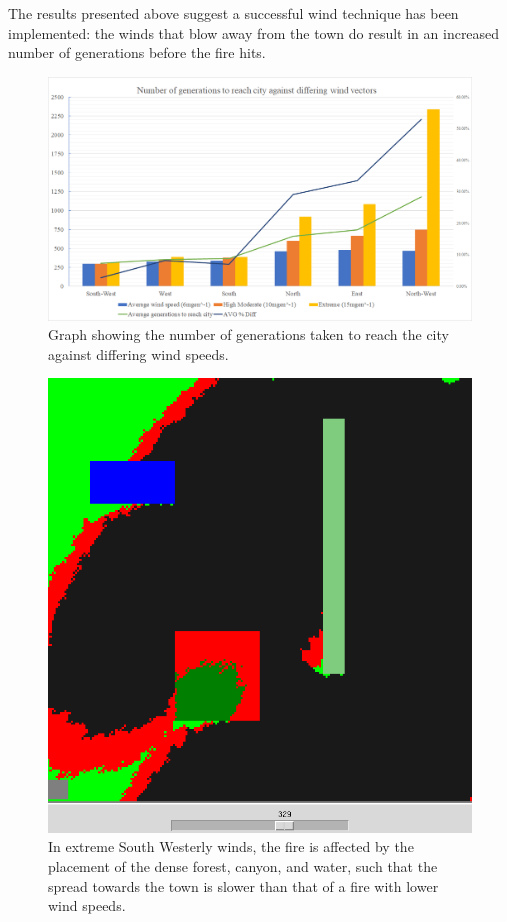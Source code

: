 \documentclass[11pt, a4paper, titlepage]{article}
\begin{document}
    The results presented above suggest a successful wind technique has been implemented: the winds that blow away from the town do result in an increased number of generations before the fire hits.
    
    
    \begin{figure}[H]
      \centering
        \includegraphics[width=\linewidth]{imgs/graphs/wind.png}
      \caption{Graph showing the number of generations taken to reach the city against differing wind speeds.}
      \label{}
    \end{figure}

  



    \begin{figure}[H]
      \centering
      \includegraphics[width=0.75\linewidth]{imgs/wind/x-15y15_gen329}
      \caption{In extreme South Westerly winds, the fire is affected by the placement of the dense forest, canyon, and water, such that the spread towards the town is slower than that of a fire with lower wind speeds.}
      \label{}
    \end{figure}
\end{document}
